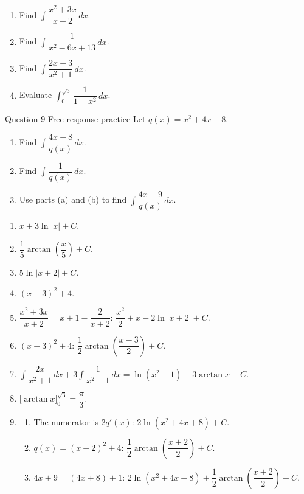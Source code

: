 \documentclass[11pt]{article}
\begin{document}
\begin{enumerate}[leftmargin=*,itemsep=2pt,start=5]
  \item Find $\displaystyle\int\dfrac{x^2+3x}{x+2}\,dx$.\work{2.8cm}
  \item Find $\displaystyle\int\dfrac{1}{x^2-6x+13}\,dx$.\work{2.8cm}
  \item Find $\displaystyle\int\dfrac{2x+3}{x^2+1}\,dx$.\work{2.8cm}
  \item Evaluate $\displaystyle\int_0^{\sqrt3}\dfrac{1}{1+x^2}\,dx$.\work{2.8cm}
\end{enumerate}

\begin{frbox}{Question 9 \textperiodcentered{} Free-response practice}
Let $q(x)=x^2+4x+8$.
\begin{enumerate}[label=(\alph*),leftmargin=*,itemsep=2pt]
  \item Find $\displaystyle\int\dfrac{4x+8}{q(x)}\,dx$.\work{2.6cm}
  \item Find $\displaystyle\int\dfrac{1}{q(x)}\,dx$.\work{2.6cm}
  \item Use parts (a) and (b) to find $\displaystyle\int\dfrac{4x+9}{q(x)}\,dx$.\work{2.6cm}
\end{enumerate}
\end{frbox}

\newpage
\begin{solbox}
\begin{enumerate}[leftmargin=*,itemsep=4pt]
  \item $x+3\ln|x|+C$.
  \item $\dfrac15\arctan\!\left(\dfrac x5\right)+C$.
  \item $5\ln|x+2|+C$.
  \item $(x-3)^2+4$.
  \item $\dfrac{x^2+3x}{x+2}=x+1-\dfrac{2}{x+2}$: $\dfrac{x^2}{2}+x-2\ln|x+2|+C$.
  \item $(x-3)^2+4$: $\dfrac12\arctan\!\left(\dfrac{x-3}{2}\right)+C$.
  \item $\displaystyle\int\dfrac{2x}{x^2+1}\,dx+3\int\dfrac{1}{x^2+1}\,dx=\ln\!\left(x^2+1\right)+3\arctan x+C$.
  \item $\Big[\arctan x\Big]_0^{\sqrt3}=\dfrac\pi3$.
  \item \begin{enumerate}[label=(\alph*),leftmargin=*,itemsep=3pt]
    \item The numerator is $2q'(x)$: $2\ln\!\left(x^2+4x+8\right)+C$.
    \item $q(x)=(x+2)^2+4$: $\dfrac12\arctan\!\left(\dfrac{x+2}{2}\right)+C$.
    \item $4x+9=(4x+8)+1$: $2\ln\!\left(x^2+4x+8\right)+\dfrac12\arctan\!\left(\dfrac{x+2}{2}\right)+C$.
  \end{enumerate}
\end{enumerate}
\end{solbox}
\end{document}
